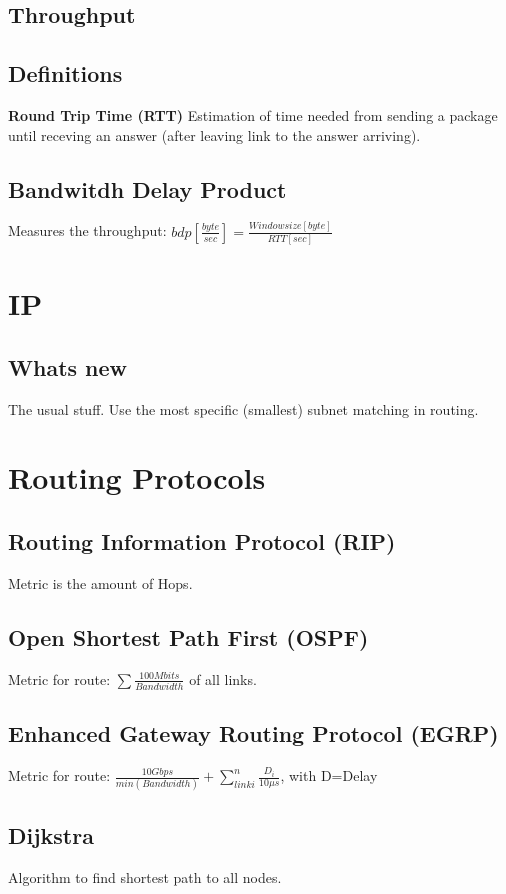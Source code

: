 \documentclass{article}
\begin{document}
\subsection{Throughput}
\subsection{Definitions}

\textbf{Round Trip Time (RTT)}
Estimation of time needed from sending a package until receving an answer (after leaving link to the answer arriving).

\subsection{Bandwitdh Delay Product}
Measures the throughput: $bdp [\frac{byte}{sec}] = \frac{Windowsize [byte]}{RTT [sec]}$

\section{IP}
\subsection{Whats new}
The usual stuff. Use the most specific (smallest) subnet matching in routing.

\section{Routing Protocols}
\subsection{Routing Information Protocol (RIP)}
Metric is the amount of Hops.

\subsection{Open Shortest Path First (OSPF)}
Metric for route: $\sum{\frac{100 Mbits}{Bandwidth}}$ of all links.

\subsection{Enhanced Gateway Routing Protocol (EGRP)}
Metric for route: $ \frac{10 Gbps}{min(Bandwidth)} + \sum\limits_{link i}^{n} \frac{D_i}{10\mu s}$, with D=Delay

\subsection{Dijkstra}
Algorithm to find shortest path to all nodes.
\end{document}
